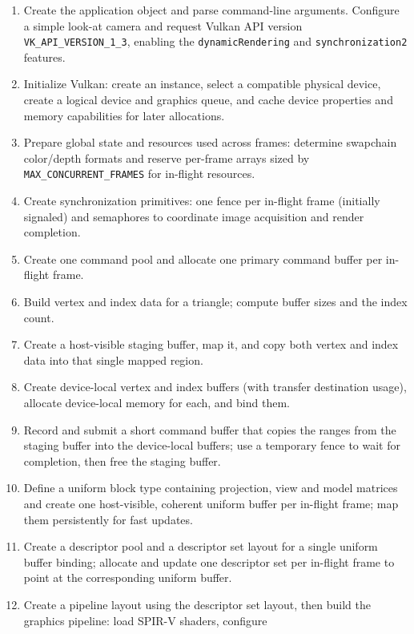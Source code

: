 \documentclass{article}
\begin{document}
\begin{enumerate}
  \item Create the application object and parse command-line
    arguments. Configure a simple look-at camera and request Vulkan
    API version \texttt{VK\_API\_VERSION\_1\_3}, enabling the
    \texttt{dynamicRendering} and \texttt{synchronization2} features.
  \item Initialize Vulkan: create an instance, select a compatible
    physical device, create a logical device and graphics queue, and
    cache device properties and memory capabilities for later allocations.
  \item Prepare global state and resources used across frames:
    determine swapchain color/depth formats and reserve per-frame
    arrays sized by \texttt{MAX\_CONCURRENT\_FRAMES} for in-flight resources.
  \item Create synchronization primitives: one fence per in-flight
    frame (initially signaled) and semaphores to coordinate image
    acquisition and render completion.
  \item Create one command pool and allocate one primary command
    buffer per in-flight frame.
  \item Build vertex and index data for a triangle; compute buffer
    sizes and the index count.
  \item Create a host-visible staging buffer, map it, and copy both
    vertex and index data into that single mapped region.
  \item Create device-local vertex and index buffers (with transfer
    destination usage), allocate device-local memory for each, and bind them.
  \item Record and submit a short command buffer that copies the
    ranges from the staging buffer into the device-local buffers; use
    a temporary fence to wait for completion, then free the staging buffer.
  \item Define a uniform block type containing projection, view and
    model matrices and create one host-visible, coherent uniform
    buffer per in-flight frame; map them persistently for fast updates.
  \item Create a descriptor pool and a descriptor set layout for a
    single uniform buffer binding; allocate and update one descriptor
    set per in-flight frame to point at the corresponding uniform buffer.
  \item Create a pipeline layout using the descriptor set layout,
    then build the graphics pipeline: load SPIR-V shaders, configure

\end{enumerate}
\end{document}
